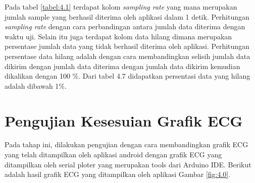Pada tabel \ref{tabel:4.1} terdapat kolom \textit{sampling rate} yang mana merupakan jumlah sample yang berhasil diterima oleh aplikasi dalam 1
detik. Perhitungan \textit{sampling rate} dengan cara perbandingan antara
jumlah data diterima dengan waktu uji. Selain itu juga terdapat
kolom data hilang dimana merupakan persentase jumlah data yang
tidak berhasil diterima oleh aplikasi. Perhitungan persentase data hilang adalah dengan cara membandingkan selisih jumlah data
dikirim dengan jumlah data diterima dengan jumlah data dikirim
kemudian dikalikan dengan 100 \%. Dari tabel 4.7 didapatkan persentasi data yang hilang adalah dibawah 1\%.

\vspace{1ex}


\section{Pengujian Kesesuian Grafik ECG}
\vspace{1ex}

Pada tahap ini, dilakukan pengujian dengan cara membandingkan grafik ECG yang telah ditampilkan oleh aplikasi android dengan grafik ECG yang ditampilkan oleh serial ploter yang merupakan tools dari Arduino IDE. Berikut adalah hasil grafik ECG yang ditampilkan oleh aplikasi Gambar \ref{fig:4.0}.

